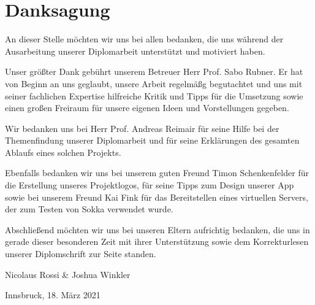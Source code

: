 \section*{Danksagung}

An dieser Stelle möchten wir uns bei allen bedanken, die uns während der Ausarbeitung unserer Diplomarbeit unterstützt und motiviert haben.

Unser größter Dank gebührt unserem Betreuer Herr Prof. Sabo Rubner. Er hat von Beginn an uns geglaubt, unsere Arbeit regelmäßg begutachtet und uns mit seiner fachlichen Expertise hilfreiche Kritik und Tipps für die Umsetzung sowie einen großen Freiraum für unsere eigenen Ideen und Vorstellungen gegeben.

Wir bedanken uns bei Herr Prof. Andreas Reimair für seine Hilfe bei der Themenfindung unserer Diplomarbeit und für seine Erklärungen des gesamten Ablaufs eines solchen Projekts.

Ebenfalls bedanken wir uns bei unserem guten Freund Timon Schenkenfelder für die Erstellung unseres Projektlogos, für seine Tipps zum Design unserer App sowie bei unserem Freund Kai Fink für das Bereitstellen eines virtuellen Servers, der zum Testen von Sokka verwendet wurde.

Abschließend möchten wir uns bei unseren Eltern aufrichtig bedanken, die uns in gerade dieser besonderen Zeit mit ihrer Unterstützung sowie dem Korrekturlesen unserer Diplomschrift zur Seite standen.

\vspace{1cm}

Nicolaus Rossi \& Joshua Winkler

Innsbruck, 18. März 2021

\newpage